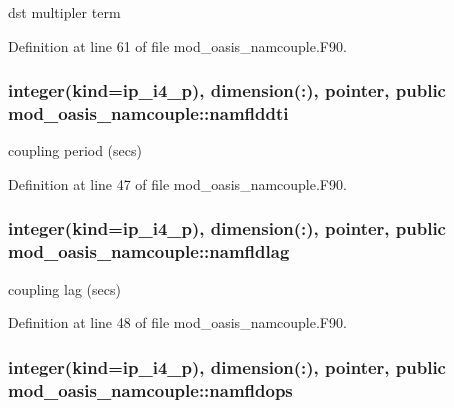 dst multipler term 



Definition at line 61 of file mod\+\_\+oasis\+\_\+namcouple.\+F90.

\hypertarget{classmod__oasis__namcouple_a9080617143dacb027f74c4c5158b5e58}{
\subsubsection[{namflddti}]{\setlength{\rightskip}{0pt plus 5cm}integer(kind=ip\+\_\+i4\+\_\+p), dimension(\+:), pointer, public mod\+\_\+oasis\+\_\+namcouple\+::namflddti}}\label{classmod__oasis__namcouple_a9080617143dacb027f74c4c5158b5e58}


coupling period (secs) 



Definition at line 47 of file mod\+\_\+oasis\+\_\+namcouple.\+F90.

\hypertarget{classmod__oasis__namcouple_a6a4406ca14f91ef6514a18eb154e648f}{
\subsubsection[{namfldlag}]{\setlength{\rightskip}{0pt plus 5cm}integer(kind=ip\+\_\+i4\+\_\+p), dimension(\+:), pointer, public mod\+\_\+oasis\+\_\+namcouple\+::namfldlag}}\label{classmod__oasis__namcouple_a6a4406ca14f91ef6514a18eb154e648f}


coupling lag (secs) 



Definition at line 48 of file mod\+\_\+oasis\+\_\+namcouple.\+F90.

\hypertarget{classmod__oasis__namcouple_a4841e350d91926f5f8403e73442c76ad}{
\subsubsection[{namfldops}]{\setlength{\rightskip}{0pt plus 5cm}integer(kind=ip\+\_\+i4\+\_\+p), dimension(\+:), pointer, public mod\+\_\+oasis\+\_\+namcouple\+::namfldops}}\label{classmod__oasis__namcouple_a4841e350d91926f5f8403e73442c76ad}


